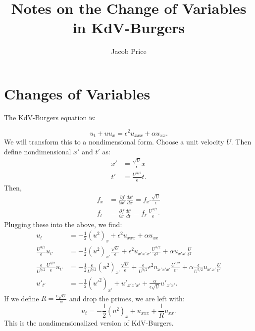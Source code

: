 \documentclass{article}
\title{Notes on the Change of Variables in KdV-Burgers}
\author{Jacob Price}
\begin{document}
\maketitle


\section{Changes of Variables}

The KdV-Burgers equation is:

\begin{equation}
u_t + uu_x = \epsilon^2 u_{xxx}+\alpha u_{xx}.
\end{equation}We will transform this to a nondimensional form. Choose a unit velocity $U$. Then define nondimensional $x'$ and $t'$ as:
\begin{align}
x' &= \frac{\sqrt{U}}{\epsilon }x\\
t' &= \frac{U^{3/2}}{\epsilon}t.
\end{align}Then,
\begin{align}
f_x &= \frac{\partial f}{\partial x'}\frac{dx'}{dx} = f_{x'}\frac{\sqrt{U}}{\epsilon}\\
f_t &= \frac{\partial f}{\partial t'}\frac{dt'}{dt} = f_{t'}\frac{U^{3/2}}{\epsilon}.
\end{align}Plugging these into the above, we find:
\begin{align*}
u_t &= - \frac{1}{2}(u^2)_x + \epsilon^2 u_{xxx}+\alpha u_{xx}\\
\frac{U^{3/2}}{\epsilon} u_{t'} &= -\frac{1}{2}(u^2)_{x'}\frac{\sqrt{U}}{\epsilon}+\epsilon^2 u_{x'x'x'}\frac{U^{3/2}}{\epsilon^3}+\alpha u_{x'x'}\frac{U}{\epsilon^2}\\
\frac{\epsilon}{U^{5/2}}\frac{U^{3/2}}{\epsilon} u_{t'} &= -\frac{1}{2}\frac{\epsilon}{U^{5/2}}(u^2)_{x'}\frac{\sqrt{U}}{\epsilon}+\frac{\epsilon}{U^{5/2}}\epsilon^2 u_{x'x'x'}\frac{U^{3/2}}{\epsilon^3}+\alpha \frac{\epsilon}{U^{5/2}}u_{x'x'}\frac{U}{\epsilon^2}\\
u'_{t'} &= -\frac{1}{2}(u'^2)_{x'}+u'_{x'x'x'}+\frac{\alpha}{\epsilon \sqrt{U}}u'_{x'x'}.
\end{align*}If we define $R = \frac{\epsilon\sqrt{U}}{\alpha}$ and drop the primes, we are left with:
\begin{equation}
u_t = -\frac{1}{2}(u^2)_x+u_{xxx}+\frac{1}{R}u_{xx}.
\end{equation}This is the nondimensionalized version of KdV-Burgers.
\end{document}
